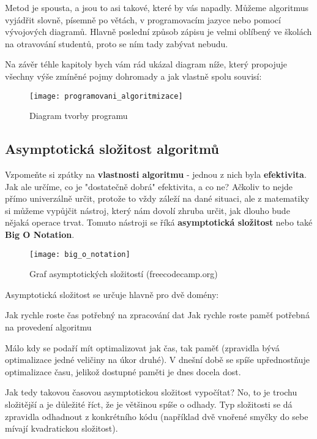 Metod je spousta, a jsou to asi takové, které by vás napadly. Můžeme algoritmus vyjádřit slovně, písemně po větách, v programovacím jazyce nebo pomocí vývojových diagramů. Hlavně poslední způsob zápisu je velmi oblíbený ve školách na otravování studentů, proto se ním tady zabývat nebudu.

Na závěr téhle kapitoly bych vám rád ukázal diagram níže, který propojuje všechny výše zmíněné pojmy dohromady a jak vlastně spolu souvisí:
\begin{figure}[H]
	\texttt{[image: programovani\_algoritmizace]}
	\centering
	\caption{Diagram tvorby programu}
\end{figure}

\subsection{Asymptotická složitost algoritmů}
Vzpomeňte si zpátky na \textbf{vlastnosti algoritmu} - jednou z nich byla \textbf{efektivita}. Jak ale určíme, co je "dostatečně dobrá" efektivita, a co ne? Ačkoliv to nejde přímo univerzálně určit, protože to vždy záleží na dané situaci, ale z matematiky si můžeme vypůjčit nástroj, který nám dovolí zhruba určit, jak dlouho bude nějaká operace trvat. Tomuto nástroji se říká \textbf{asymptotická složitost} nebo také \textbf{Big O Notation}.

\begin{figure}[H]
	\texttt{[image: big\_o\_notation]}
	\centering
	\caption{Graf asymptotických složitostí (freecodecamp.org)}
\end{figure}

Asymptotická složitost se určuje hlavně pro dvě domény:
\begin{enumerate}
	 Jak rychle roste čas potřebný na zpracování dat
	 Jak rychle roste paměť potřebná na provedení algoritmu
\end{enumerate}

Málo kdy se podaří mít optimalizovat jak čas, tak paměť (zpravidla bývá optimalizace jedné veličiny na úkor druhé). V dnešní době se spíše upřednostňuje optimalizace času, jelikož dostupné paměti je dnes docela dost.

Jak tedy takovou časovou asymptotickou složitost vypočítat? No, to je trochu složitější a je důležité říct, že je většinou spíše o odhady. Typ složitosti se dá zpravidla odhadnout z konkrétního kódu (například dvě vnořené smyčky do sebe mívají kvadratickou složitost). 

